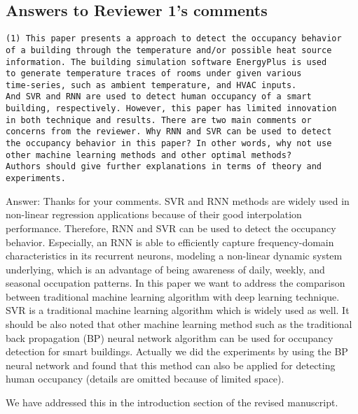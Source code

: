 \subsection{Answers to Reviewer 1's comments}
\begin{verbatim}
(1) This paper presents a approach to detect the occupancy behavior
of a building through the temperature and/or possible heat source
information. The building simulation software EnergyPlus is used
to generate temperature traces of rooms under given various
time-series, such as ambient temperature, and HVAC inputs.
And SVR and RNN are used to detect human occupancy of a smart
building, respectively. However, this paper has limited innovation
in both technique and results. There are two main comments or
concerns from the reviewer. Why RNN and SVR can be used to detect
the occupancy behavior in this paper? In other words, why not use
other machine learning methods and other optimal methods?
Authors should give further explanations in terms of theory and
experiments.
\end{verbatim}

Answer: Thanks for your comments. SVR and RNN methods are widely used
in non-linear regression applications because of their good
interpolation performance. Therefore, RNN and SVR can be used to
detect the occupancy behavior. Especially, an RNN is able to
efficiently capture frequency-domain characteristics in its recurrent
neurons, modeling a non-linear dynamic system underlying, which is an
advantage of being awareness of daily, weekly, and seasonal occupation
patterns. In this paper we want to address the comparison between
traditional machine learning algorithm with deep learning
technique. SVR is a traditional machine learning algorithm which is
widely used as well. It should be also noted that other machine
learning method such as the traditional back propagation (BP) neural
network algorithm can be used for occupancy detection for smart
buildings. Actually we did the experiments by using the BP neural
network and found that this method can also be applied for detecting
human occupancy (details are omitted because of limited space). 

We have addressed this in the introduction section of the revised
manuscript.

